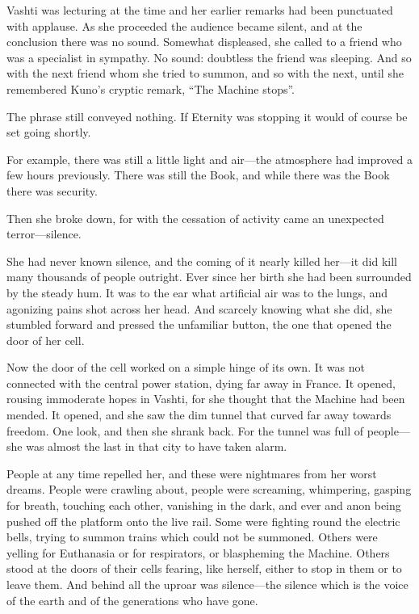 Vashti was lecturing at the time and her earlier remarks had been punctuated with applause. As she proceeded the audience became silent, and at the conclusion there was no sound. Somewhat displeased, she called to a friend who was a specialist in sympathy. No sound: doubtless the friend was sleeping. And so with the next friend whom she tried to summon, and so with the next, until she remembered Kuno's cryptic remark, ``The Machine stops''.

The phrase still conveyed nothing. If Eternity was stopping it would of course be set going shortly.

For example, there was still a little light and air---the atmosphere had improved a few hours previously. There was still the Book, and while there was the Book there was security.

Then she broke down, for with the cessation of activity came an unexpected terror---silence.

She had never known silence, and the coming of it nearly killed her---it did kill many thousands of people outright. Ever since her birth she had been surrounded by the steady hum. It was to the ear what artificial air was to the lungs, and agonizing pains shot across her head. And scarcely knowing what she did, she stumbled forward and pressed the unfamiliar button, the one that opened the door of her cell.

Now the door of the cell worked on a simple hinge of its own. It was not connected with the central power station, dying far away in France. It opened, rousing immoderate hopes in Vashti, for she thought that the Machine had been mended. It opened, and she saw the dim tunnel that curved far away towards freedom. One look, and then she shrank back. For the tunnel was full of people---she was almost the last in that city to have taken alarm.

People at any time repelled her, and these were nightmares from her worst dreams. People were crawling about, people were screaming, whimpering, gasping for breath, touching each other, vanishing in the dark, and ever and anon being pushed off the platform onto the live rail. Some were fighting round the electric bells, trying to summon trains which could not be summoned. Others were yelling for Euthanasia or for respirators, or blaspheming the Machine. Others stood at the doors of their cells fearing, like herself, either to stop in them or to leave them. And behind all the uproar was silence---the silence which is the voice of the earth and of the generations who have gone. %


